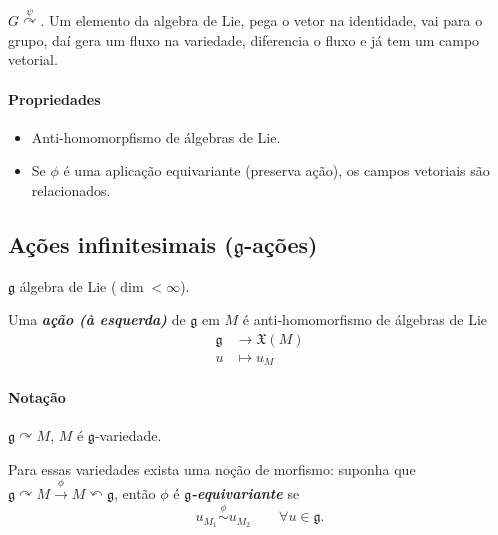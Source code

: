 $G\overset{\psi}{\curvearrowright }$. Um elemento da algebra de Lie, pega o vetor na identidade, vai para o grupo, daí gera um fluxo na variedade, diferencia o fluxo e já tem um campo vetorial.

\paragraph{Propriedades} 
\begin{itemize}
\item Anti-homomorpfismo de álgebras de Lie.
\item Se $\phi$ é uma aplicação equivariante (preserva ação), os campos vetoriais são relacionados.
\end{itemize}

\subsection{Ações  infinitesimais ($\mathfrak{g}$-ações)}

$\mathfrak{g}$ álgebra de Lie ($\dim <\infty$).

\begin{defn}
	Uma \textit{\textbf{ação (à esquerda)}} de $\mathfrak{g}$ em $M$ é anti-homomorfismo de álgebras de Lie
	\begin{align*}
		\mathfrak{g} &\longrightarrow \mathfrak{X}(M) \\
		u &\longmapsto u_M
	\end{align*}	
\end{defn}

\paragraph{Notação} $\mathfrak{g} \curvearrowright M$, $M$ é $\mathfrak{g}$-variedade.

Para essas variedades exista uma noção de morfismo: suponha que $\mathfrak{g} \curvearrowright M\overset{\phi}{\longrightarrow}M\curvearrowleft \mathfrak{g}$, então $\phi$ é  \textit{\textbf{$\mathfrak{g}$-equivariante}} se
\[u_{M_1}\overset{\phi}{\sim}u_{M_2}\qquad \forall u\in\mathfrak{g}.\]

